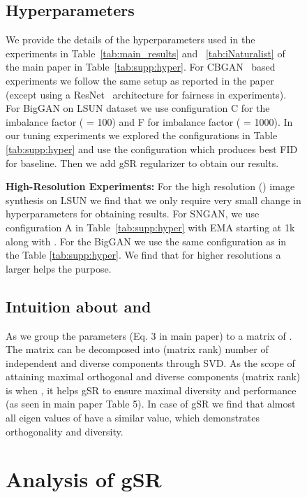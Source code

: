 \documentclass[runningheads,table]{llncs}
\begin{document}
\begin{figure*}[!ht]
\begin{subfigure}[b]{\textwidth}
\begin{table}[!t]
\end{table}



\subsection{Hyperparameters}
\label{subsec:supp:hparams}
We provide the details of the hyperparameters used in the experiments in Table~\ref{tab:main_results} and ~\ref{tab:iNaturalist} of the main paper in Table~\ref{tab:supp:hyper}. For CBGAN~\cite{rangwani2021class} based experiments we follow the same setup as reported in the paper (except using a ResNet~\cite{gulrajani2017improved} architecture for fairness in experiments). For BigGAN on LSUN dataset we use configuration C for the imbalance factor ( = 100) and F for imbalance factor ( = 1000). In our tuning experiments we explored the configurations in Table \ref{tab:supp:hyper} and use the configuration which produces best FID for baseline. Then we add gSR regularizer to obtain our results. 

\noindent \vspace{1mm} \textbf{High-Resolution Experiments:} For the high resolution () image synthesis on LSUN we find that we only require very small change in hyperparameters for obtaining results. For SNGAN, we use configuration A in Table~\ref{tab:supp:hyper} with EMA starting at 1k along with . For the BigGAN we use the same configuration as in the Table \ref{tab:supp:hyper}. We find that for higher resolutions a larger  helps the purpose.

\subsection{Intuition about  and }
\label{subsec:supp:intuition}
As we group the parameters  (Eq. {\color{red} 3} in main paper) to a matrix  of . The matrix can be decomposed into  (matrix rank) number of independent and diverse components through SVD. As the scope of attaining maximal orthogonal and diverse components (matrix rank) is when , it helps gSR to ensure maximal diversity and performance (as seen in main paper Table {\color{red} 5}). In case of gSR we find that almost all eigen values of  have a similar value, which demonstrates orthogonality and diversity. \\

\section{Analysis of gSR}
\label{sec:supp:analysis_gsr} 




\end{subfigure}
\end{figure*}
\end{document}
